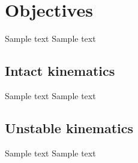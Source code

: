 \chapter{Objectives}

Sample text Sample text

\section{Intact kinematics}

Sample text Sample text

\section{Unstable kinematics}

Sample text Sample text